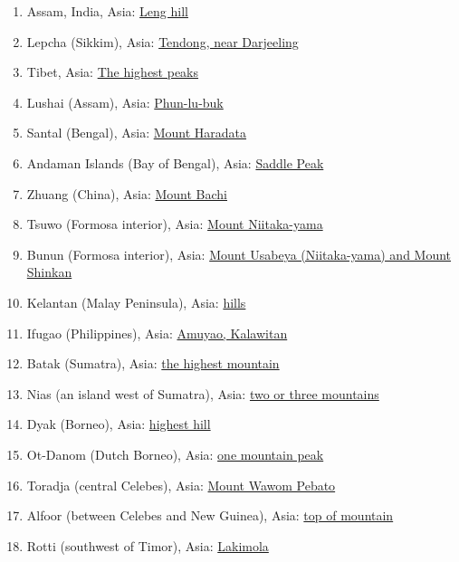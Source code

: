 \documentclass[10pt,twocolumn,letterpaper]{article}
\begin{document}
\begin{flushleft}
\begin{enumerate}
\item Assam, India, Asia: \href{http://www.talkorigins.org/faqs/flood-myths.html#Assam}{Leng hill}
\item Lepcha (Sikkim), Asia: \href{http://www.talkorigins.org/faqs/flood-myths.html#Lepcha}{Tendong, near Darjeeling}
\item Tibet, Asia: \href{http://www.talkorigins.org/faqs/flood-myths.html#Tibet}{The highest peaks}
\item Lushai (Assam), Asia: \href{http://www.talkorigins.org/faqs/flood-myths.html#Lushai}{Phun-lu-buk}
\item Santal (Bengal), Asia: \href{http://www.talkorigins.org/faqs/flood-myths.html#Santal}{Mount Haradata}
\item Andaman Islands (Bay of Bengal), Asia: \href{http://www.talkorigins.org/faqs/flood-myths.html#AndamanIs}{Saddle Peak}
\item Zhuang (China), Asia: \href{http://www.talkorigins.org/faqs/flood-myths.html#Zhuang}{Mount Bachi}
\item Tsuwo (Formosa interior), Asia: \href{http://www.talkorigins.org/faqs/flood-myths.html#Tsuwo}{Mount Niitaka-yama}
\item Bunun (Formosa interior), Asia: \href{http://www.talkorigins.org/faqs/flood-myths.html#Bunun}{Mount Usabeya (Niitaka-yama) and Mount Shinkan}
\item Kelantan (Malay Peninsula), Asia: \href{http://www.talkorigins.org/faqs/flood-myths.html#Kelantan}{hills}
\item Ifugao (Philippines), Asia: \href{http://www.talkorigins.org/faqs/flood-myths.html#Ifugao}{Amuyao, Kalawitan}
\item Batak (Sumatra), Asia: \href{http://www.talkorigins.org/faqs/flood-myths.html#Batak}{the highest mountain}
\item Nias (an island west of Sumatra), Asia: \href{http://www.talkorigins.org/faqs/flood-myths.html#Nias}{two or three mountains}
\item Dyak (Borneo), Asia: \href{http://www.talkorigins.org/faqs/flood-myths.html#Dyak}{highest hill}
\item Ot-Danom (Dutch Borneo), Asia: \href{http://www.talkorigins.org/faqs/flood-myths.html#OtDanom}{one mountain peak}
\item Toradja (central Celebes), Asia: \href{http://www.talkorigins.org/faqs/flood-myths.html#Toradja}{Mount Wawom Pebato}
\item Alfoor (between Celebes and New Guinea), Asia: \href{http://www.talkorigins.org/faqs/flood-myths.html#Alfoor}{top of mountain}
\item Rotti (southwest of Timor), Asia: \href{http://www.talkorigins.org/faqs/flood-myths.html#Rotti}{Lakimola}
\end{enumerate}
\end{flushleft}
\end{document}
